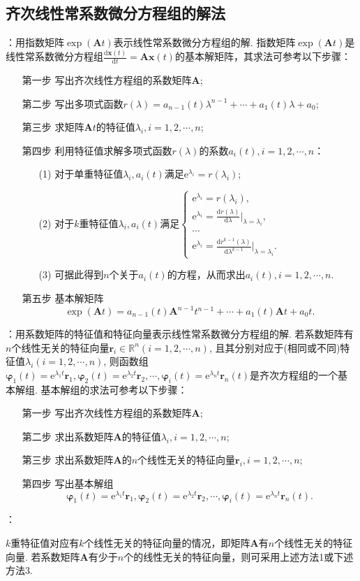 \documentclass[12pt,UTF8]{ctexart}
\newcommand{\me}[0]{\mathrm e}
\newcommand{\dd}[2]{\frac{\mathrm d #1}{\mathrm d #2}}
\begin{document}
\subsection{齐次线性常系数微分方程组的解法}\label{homo-lin-eq}
\begin{enumerate}
：用指数矩阵$\exp(\bm At)$表示线性常系数微分方程组的解. 指数矩阵$\exp(\bm At)$是线性常系数微分方程组$\dd{\bm x(t)}t=\bm A\bm x(t)$的基本解矩阵，其求法可参考以下步骤：
\begin{enumerate}
\item[第一步]写出齐次线性方程组的系数矩阵$\bm A$;
\item[第二步]写出多项式函数$r(\lambda)=a_{n-1}(t)\lambda^{n-1}+\cdots+a_1(t)\lambda+a_0$;
\item[第三步]求矩阵$\bm At$的特征值$\lambda_i,i=1,2,\cdots,n$;
\item[第四步]利用特征值求解多项式函数$r(\lambda)$的系数$a_i(t),i=1,2,\cdots,n$：
\begin{enumerate}
\item[(1)]对于单重特征值$\lambda_i,a_i(t)$满足$\me^{\lambda_i}=r(\lambda_i)$;
\item[(2)]对于$k$重特征值$\lambda_i,a_i(t)$满足$\begin{cases}
\me^{\lambda_i}=r(\lambda_i),\\
\me^{\lambda_i}=\dd{r(\lambda)}\lambda\big|_{\lambda=\lambda_i},\\
\cdots\\
\me^{\lambda_i}=\dd{r^{k-1}(\lambda)}{\lambda^{k-1}}\big|_{\lambda=\lambda_i}.
\end{cases}$
\item[(3)]可据此得到$n$个关于$a_i(t)$的方程，从而求出$a_i(t),i=1,2,\cdots,n$.
\end{enumerate}
\item[第五步]基本解矩阵
\[\exp(\bm At)=a_{n-1}(t)\bm A^{n-1}t^{n-1}+\cdots+a_1(t)\bm At+a_0t.\]
\end{enumerate}
：用系数矩阵的特征值和特征向量表示线性常系数微分方程组的解. 若系数矩阵有$n$个线性无关的特征向量$\bm r_i\in\mathbb R^n(i=1,2,\cdots,n)$, 且其分别对应于(相同或不同)特征值$\lambda_i(i=1,2,\cdots,n)$, 则函数组$\bm\varphi_1(t)=\me^{\lambda_1t}\bm r_1,\bm\varphi_2(t)=\me^{\lambda_2t}\bm r_2,\cdots,\bm\varphi_i(t)=\me^{\lambda_nt}\bm r_n(t)$是齐次方程组的一个基本解组. 基本解组的求法可参考以下步骤：
\begin{enumerate}
\item[第一步]写出齐次线性方程组的系数矩阵$\bm A$;
\item[第二步]求出系数矩阵$\bm A$的特征值$\lambda_i,i=1,2,\cdots,n$;
\item[第三步]求出系数矩阵$\bm A$的$n$个线性无关的特征向量$\bm r_i,i=1,2,\cdots,n$;
\item[第四步]写出基本解组
\[\bm\varphi_1(t)=\me^{\lambda_1t}\bm r_1,\bm\varphi_2(t)=\me^{\lambda_2t}\bm r_2,\cdots,\bm\varphi_i(t)=\me^{\lambda_nt}\bm r_n(t).\]
\end{enumerate}
{：}
\begin{enumerate}
$k$重特征值对应有$k$个线性无关的特征向量的情况，即矩阵$\bm A$有$n$个线性无关的特征向量. 若系数矩阵$\bm A$有少于$n$个的线性无关的特征向量，则可采用上述方法1或下述方法3.


\end{enumerate}
\end{enumerate}
\end{document}
